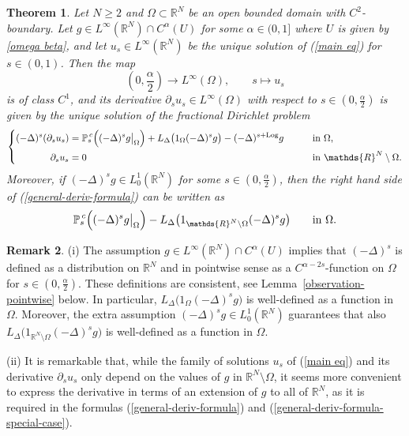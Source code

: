 \documentclass[notitlepage,11pt,reqno]{amsart}
\newtheorem{theorem}{Theorem}[section]
\theoremstyle{definition}
\newtheorem{remark}[theorem]{Remark}
\numberwithin{equation}{section}
\newcommand{\cPs}{{{\mathbb P}_s}}
\newcommand{\RRN}{\mathds{R}^{N}}
\newcommand{\R}{\mathds{R}}
\newcommand{\RR}{\mathds{R}}
\begin{document}
\begin{theorem}\label{thm1.3}
  Let $N\geq 2$ and $\Omega \subset \RRN$ be an open bounded domain with $C^2$-boundary. Let $g \in L^{\infty}(\RR^N) \cap C^{\alpha}(U)$ for some $\alpha\in(0,1]$ where $U$ is given by \eqref{omega beta}, and let $u_s \in L^\infty(\R^N)$ be the unique solution of (\ref{main eq}) for $s \in (0,1)$. Then the map
$$
(0,\frac{\alpha}{2}) \to L^\infty(\Omega), \qquad s \mapsto u_s
$$
is of class $C^1$, and its derivative $\partial_s u_s \in L^{\infty}(\Omega)$ with respect to $s \in (0,\frac{\alpha}{2})$ is given by the unique solution of the fractional Dirichlet problem 
\begin{equation}
  \label{general-deriv-formula}
\left\{  \begin{aligned}
    (-\Delta)^s (\partial_s u_s)&=   \cPs^{\!\! c}\Bigl((-\Delta)^s g\big|_{\Omega}\Bigr)+ L_\Delta \bigl(1_{\Omega} (-\Delta)^s g\bigr) - (-\Delta)^{s+\mathrm{Log}}g  &&\qquad\text{in $\Omega$,}\\ 
    \partial_s u_s & =0&&\qquad\text{in $\RRN\setminus \Omega$.}
  \end{aligned}
\right.
\end{equation}
Moreover, if $(-\Delta)^s g \in L^1_0(\R^N)$ for some $s \in (0,\frac{\alpha}{2})$, then the right hand side of (\ref{general-deriv-formula}) can be written as
\begin{equation}
  \label{general-deriv-formula-special-case}
\cPs^{\!\! c}\Bigl((-\Delta)^s g\big|_{\Omega}\Bigr)- L_\Delta \bigl(1_{\R^N \setminus \Omega} (-\Delta)^s g\bigr)\qquad\text{in $\Omega$.}
\end{equation}
\end{theorem}


\begin{remark}
  (i) The assumption $g \in L^{\infty}(\RR^N) \cap C^{\alpha}(U)$ implies that $(-\Delta)^s$ is defined as a distribution on $\R^N$ and in pointwise sense as a $C^{\alpha-2s}$-function on $\Omega$ for $s \in (0,\frac{\alpha}{2})$. These definitions are consistent, see Lemma~\ref{observation-pointwise} below. In particular, $L_\Delta \bigl(1_{\Omega} (-\Delta)^s g\bigr)$ is well-defined as a function in $\Omega$.  Moreover, the extra assumption $(-\Delta)^s g \in L^1_0(\R^N)$ guarantees that also $L_\Delta \bigl(1_{\R^N \setminus \Omega} (-\Delta)^s g\bigr)$ is well-defined as a function in $\Omega$.
  

(ii) It is remarkable that, while the family of solutions $u_s$ of (\ref{main eq}) and its derivative $\partial_s u_s$ only depend on the values of $g$ in $\R^N \setminus \Omega$, it seems more convenient to express the derivative in terms of an extension of $g$ to all of $\R^N$, as it is required in the formulas (\ref{general-deriv-formula}) and (\ref{general-deriv-formula-special-case}).

\end{remark}
\end{document}
